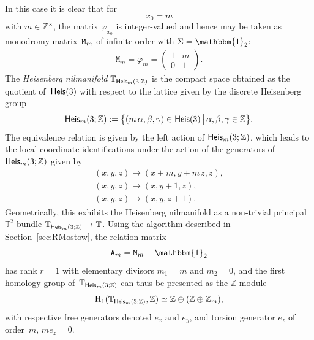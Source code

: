 \documentclass[10pt,a4paper]{amsart}
\numberwithin{equation}{section}
\newcommand{\Z}{\zed}
\newcommand{\unit}{\mathbbm{1}} 			%
\newcommand{\ttM}{\mathtt{M}}
\newcommand{\Heis}{{\sf Heis}}
\newcommand{\zed}{{\mathbb Z}} %
\newcommand{\torus}{{\mathbb T}} %
\begin{document}
In this case it is clear that for
\[
x_0=m
\]
with $m\in\Z^\times$, the matrix $\varphi_{x_0}$ is integer-valued and hence
may be taken as monodromy matrix~${\tt M}_m$ of infinite order with $\Sigma=\unit_2$:
\begin{gather}\label{eq:parmon}
\ttM_m = \varphi_m = \left( \begin{matrix}
1 & m \\
0 & 1
\end{matrix} \right) .
\end{gather}
The \emph{Heisenberg nilmanifold} $\torus_{\Heis_m(3;\Z)}$ is the compact
space obtained as the quotient of~$\Heis(3)$ with respect to the
lattice given by the discrete Heisenberg group
\[
\Heis_m(3;\Z):=\big\{(m\,\alpha,\beta,\gamma)\in\Heis(3)\, \big|\,
\alpha,\beta,\gamma\in\zed\big\} .
\]
The equivalence relation
is given by the left action of $\Heis_m(3;\Z)$, which
leads to the local coordinate identifications under the action of the
generators of $\Heis_m(3;\Z)$ given by
\begin{gather}
(x,y,z)\longmapsto (x+m,y+m\,z,z) , \nonumber \\
(x,y,z)\longmapsto (x,y+1,z) , \nonumber \\
(x,y,z)\longmapsto (x,y,z+1) .\label{eq:H3integeraction}
\end{gather}
Geometrically, this exhibits the Heisenberg nilmanifold as a
non-trivial principal $\torus^2$-bundle
$\torus_{\Heis_m(3;\Z)}\rightarrow \torus$.
Using the algorithm described in Section~\ref{sec:RMostow}, the
relation matrix
\[
{\tt A}_m = \ttM_m-\unit_2
\]
has rank $r=1$ with elementary divisors
$m_1=m$ and $m_2=0$, and the first homology group of~$\torus_{\Heis_m(3;\Z)}$ can thus be presented as the $\Z$-module
\begin{gather*}%
{\rm H}_1(\torus_{\Heis_m(3;\Z)},\Z) \simeq \Z
\oplus(\Z\oplus\Z_m) ,
\end{gather*}
with respective free generators denoted $e_x$ and $e_y$, and torsion
generator $e_z$ of order~$m$, $m e_z=0$.
\end{document}
